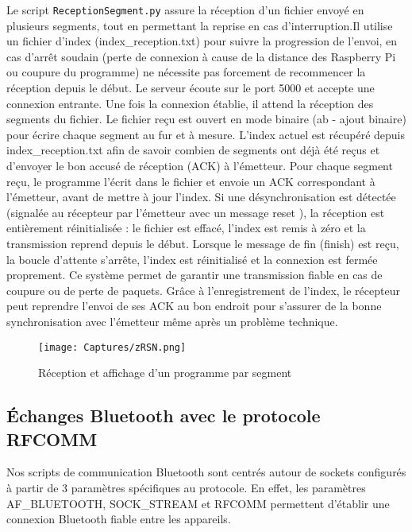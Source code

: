 \documentclass[a4paper,11pt]{article}
\begin{document}
Le script \texttt{ReceptionSegment.py} assure la réception d’un fichier envoyé en plusieurs segments, tout en permettant la reprise en cas d’interruption.Il utilise un fichier d’index (index\_reception.txt) pour suivre la progression de l’envoi, en cas d’arrêt soudain (perte de connexion à cause de la distance des Raspberry Pi ou coupure du programme) ne nécessite pas forcement de recommencer la réception depuis le début.
Le serveur écoute sur le port 5000 et accepte une connexion entrante. Une fois la connexion établie, il attend la réception des segments du fichier. Le fichier reçu est ouvert en mode binaire (ab - ajout binaire) pour écrire chaque segment au fur et à mesure. L’index actuel est récupéré depuis index\_reception.txt afin de savoir combien de segments ont déjà été reçus et d’envoyer le bon accusé de réception (ACK) à l’émetteur.
Pour chaque segment reçu, le programme l’écrit dans le fichier et envoie un ACK correspondant à l’émetteur, avant de mettre à jour l’index. Si une désynchronisation est détectée (signalée au récepteur par l’émetteur avec un message reset ), la réception est entièrement réinitialisée : le fichier est effacé, l’index est remis à zéro et la transmission reprend depuis le début.
Lorsque le message de fin (finish) est reçu, la boucle d’attente s’arrête, l’index est réinitialisé et la connexion est fermée proprement. Ce système permet de garantir une transmission fiable en cas de coupure ou de perte de paquets. Grâce à l’enregistrement de l’index, le récepteur peut reprendre l’envoi de ses ACK au bon endroit pour s’assurer de la bonne synchronisation avec l’émetteur même après un problème technique.

\begin{figure}[H]
    \centering
    \texttt{[image: Captures/zRSN.png]}
    \caption{Réception et affichage d'un programme par segment }
    \label{fig:ad-hoc}
\end{figure}


\subsection{Échanges Bluetooth avec le protocole RFCOMM}

Nos scripts de communication Bluetooth sont centrés autour de sockets configurés à partir de 3 paramètres spécifiques au protocole. En effet, les paramètres AF\_BLUETOOTH, SOCK\_STREAM et RFCOMM permettent d’établir une connexion Bluetooth fiable entre les appareils. 

\quad
\end{document}
